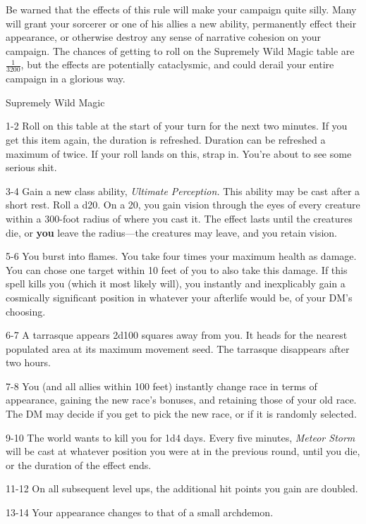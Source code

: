 Be warned that the effects of this rule will make your campaign quite silly.
Many will grant your sorcerer or one of his allies a new ability, permanently effect their appearance, or otherwise destroy any sense of narrative cohesion on your campaign.
The chances of getting to roll on the Supremely Wild Magic table are $ \frac{1}{3200} $, but the effects are potentially cataclysmic, and could derail your entire campaign in a glorious way.

\begin{rolltable}[0.6\textheight/0pt]{Supremely Wild Magic}
\item[1-2] Roll on this table at the start of your turn for the next two minutes.
If you get this item again, the duration is refreshed.
Duration can be refreshed a maximum of twice.
If your roll lands on this, strap in.
You're about to see some serious shit.
\item[3-4] Gain a new class ability, \textit{Ultimate Perception.}
This ability may be cast after a short rest.
Roll a d20.
On a 20, you gain vision through the eyes of every creature within a 300-foot radius of where you cast it.
The effect lasts until the creatures die, or \textbf{you} leave the radius---the creatures may leave, and you retain vision.
\item[5-6] You burst into flames. You take four times your maximum health as damage.
You can chose one target within 10 feet of you to also take this damage.
If this spell kills you (which it most likely will), you instantly and inexplicably gain a cosmically significant position in whatever your afterlife would be, of your DM's choosing.
\item[6-7] A tarrasque appears 2d100 squares away from you. 
It heads for the nearest populated area at its maximum movement seed. 
The tarrasque disappears after two hours.
\item[7-8] You (and all allies within 100 feet) instantly change race in terms of appearance, gaining the new race's bonuses, and retaining those of your old race.
The DM may decide if you get to pick the new race, or if it is randomly selected.
\item[9-10] The world wants to kill you for 1d4 days.
Every five minutes, \textit{Meteor Storm} will be cast at whatever position you were at in the previous round, until you die, or the duration of the effect ends.
\item[11-12] On all subsequent level ups, the additional hit points you gain are doubled.
\item[13-14] Your appearance changes to that of a small archdemon.

\end{rolltable}
